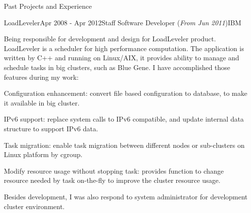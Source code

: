\documentclass{resume} %
\begin{document}
\begin{rSection}{Past Projects and Experience}
\begin{rSubsection}{LoadLeveler}{Apr 2008 - Apr 2012}{Staff Software Developer (\textit{From Jun 2011})}{IBM}

Being responsible for development and design for LoadLeveler product. LoadLeveler is a scheduler for high performance computation. The application is written by C++ and running on Linux/AIX, it provides ability to manage and schedule tasks in big clusters, such as Blue Gene. I have accomplished those features during my work:

\begin{rSubsectionList}
\item Configuration enhancement: convert file based configuration to database, to make it available in big cluster.
\item IPv6 support: replace system calls to IPv6 compatible, and update internal data structure to support IPv6 data.
\item Task migration: enable task migration between different nodes or sub-clusters on Linux platform by cgroup.
\item Modify resource usage without stopping task: provides function to change resource needed by task on-the-fly to improve the cluster resource usage.
\end{rSubsectionList}\vspace{-1.5em}

Besides development, I was also respond to system administrator for development cluster environment.
\end{rSubsection}
\vspace{1.8em}







\end{rSection}
\end{document}
